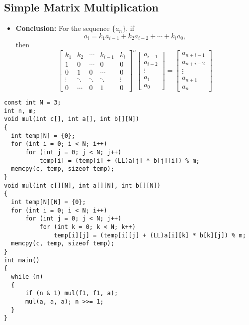 \subsection{Simple Matrix Multiplication}
\begin{itemize}
  \item \textbf{Conclusion:} For the sequence $\{a_n\}$, if
\[
a_i = k_1 a_{i-1} + k_2 a_{i-2} + \cdots + k_i a_0,
\]
then
\[
\begin{bmatrix}
k_1 & k_2 & \cdots & k_{i-1} & k_i \\
1 & 0 & \cdots & 0 & 0 \\
0 & 1 & 0 & \cdots & 0 \\
\vdots & \ddots & \ddots & \ddots & \vdots \\
0 & \cdots & 0 & 1 & 0
\end{bmatrix}^n
\begin{bmatrix}
a_{i-1} \\
a_{i-2} \\
\vdots \\
a_1 \\
a_0
\end{bmatrix}
=
\begin{bmatrix}
a_{n+i-1} \\
a_{n+i-2} \\
\vdots \\
a_{n+1} \\
a_n
\end{bmatrix}
\]
\end{itemize}
\begin{lstlisting}
const int N = 3;
int n, m;
void mul(int c[], int a[], int b[][N])
{
  int temp[N] = {0};
  for (int i = 0; i < N; i++)
      for (int j = 0; j < N; j++)
          temp[i] = (temp[i] + (LL)a[j] * b[j][i]) % m;
  memcpy(c, temp, sizeof temp);
}
void mul(int c[][N], int a[][N], int b[][N])
{
  int temp[N][N] = {0};
  for (int i = 0; i < N; i++)
      for (int j = 0; j < N; j++)
          for (int k = 0; k < N; k++)
              temp[i][j] = (temp[i][j] + (LL)a[i][k] * b[k][j]) % m;
  memcpy(c, temp, sizeof temp);
}
int main()
{
  while (n)
  {
      if (n & 1) mul(f1, f1, a);
      mul(a, a, a); n >>= 1;
  }
}
\end{lstlisting}
